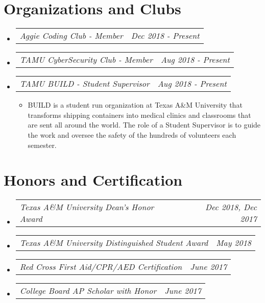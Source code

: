 \documentclass[letterpaper,11pt]{article}
\makeatletter
\newcommand{\resumeAward}[2]{
  \vspace{-1pt}
    \item\begin{tabular*}{0.97\textwidth}{l@{\extracolsep{\fill}}r}
    \textit{\small#1} & \textit{\small #2} \\
    \end{tabular*}\vspace{-20pt}
}
\newcommand{\resumeJobDesc}[1]{
  \item\small{{ #1 \vspace{-2pt}}
  }
}
\newcommand{\resumeSubHeadingListStart}{\begin{itemize}[leftmargin=*]}
\newcommand{\resumeSubHeadingListEnd}{\end{itemize}}
\newcommand{\resumeItemListStart}{\begin{itemize}}
\newcommand{\resumeItemListEnd}{\end{itemize}\vspace{-5pt}}
\makeatother
\begin{document}
\section{Organizations and Clubs}
\resumeSubHeadingListStart
        \resumeAward{Aggie Coding Club - Member}{Dec 2018 - Present}
        \resumeAward{TAMU CyberSecurity Club - Member}{Aug 2018 - Present}
        \resumeAward{TAMU BUILD - Student Supervisor}{Aug 2018 - Present}
        \vspace{3pt}
        \resumeItemListStart
                \resumeJobDesc{BUILD is a student run organization at Texas A\&M University that transforms shipping containers into medical clinics and classrooms that are sent all around the world. The role of a Student Supervisor is to guide the work and oversee the safety of the hundreds of volunteers each semester.}
        \resumeItemListEnd
\resumeSubHeadingListEnd

\section{Honors and Certification}
  \resumeSubHeadingListStart
    \resumeAward{Texas A\&M University Dean's Honor Award}{Dec 2018, Dec 2017}
    \resumeAward{Texas A\&M University Distinguished Student Award}{May 2018}
    \resumeAward{Red Cross First Aid/CPR/AED Certification}{June 2017}
    \resumeAward{College Board AP Scholar with Honor}{June 2017}
\resumeSubHeadingListEnd
\vspace{5pt}

\end{document}
